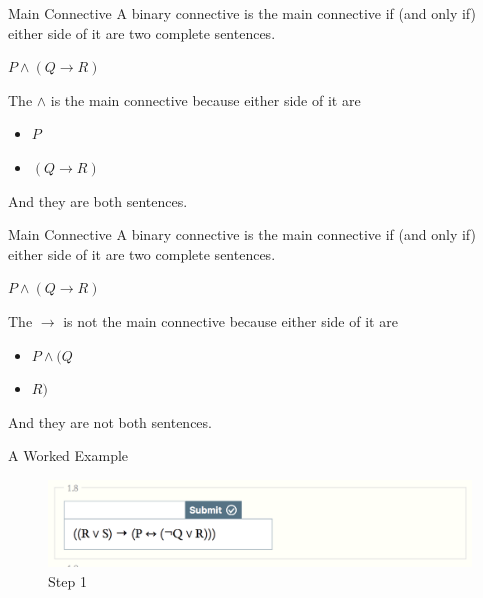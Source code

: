 \documentclass[
  ignorenonframetext,
]{beamer}
\providecommand{\tightlist}{%
  \setlength{\itemsep}{0pt}\setlength{\parskip}{0pt}}
\renewcommand{\,}{\text{, }}
\renewenvironment*{quote}	
	{\list{}{\rightmargin   \leftmargin} \item } 	
	{\endlist }
\begin{document}
\begin{frame}{Main Connective}
\protect\hypertarget{main-connective-1}{}
A binary connective is the main connective if (and only if) either side
of it are two complete sentences.

\begin{quote}
\(P \wedge (Q \rightarrow R)\)
\end{quote}

The \(\wedge\) is the main connective because either side of it are

\begin{itemize}
\tightlist
\item
  \(P\)
\item
  \((Q \rightarrow R)\)
\end{itemize}

And they are both sentences.
\end{frame}

\begin{frame}{Main Connective}
\protect\hypertarget{main-connective-2}{}
A binary connective is the main connective if (and only if) either side
of it are two complete sentences.

\begin{quote}
\(P \wedge (Q \rightarrow R)\)
\end{quote}

The \(\rightarrow\) is not the main connective because either side of it
are

\begin{itemize}
\tightlist
\item
  \(P \wedge (Q\)
\item
  \(R)\)
\end{itemize}

And they are not both sentences.
\end{frame}

\begin{frame}{A Worked Example}
\protect\hypertarget{a-worked-example}{}
\begin{figure}
\centering
\includegraphics{../images/class2_3/1.png}
\caption{Step 1}
\end{figure}
\end{frame}
\end{document}
